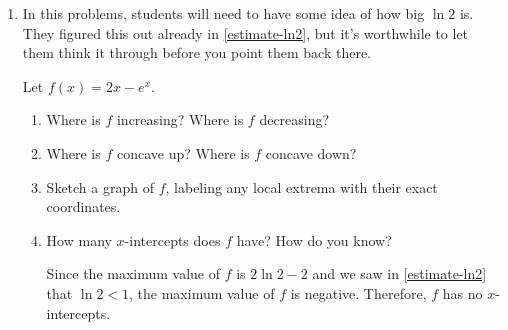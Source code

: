 \documentclass{article}
\begin{document}
\begin{enumerate}
\begin{enumerate}
  \end{enumerate}


\item 

  \begin{workshop}
    In this problems, students will need to have some idea of how big $\ln 2$ is. They figured this out already in \ref{estimate-ln2}, but it's worthwhile to let them think it through before you point them back there. 
  \end{workshop}

  Let $f(x) = 2x - e^x$.

  \begin{enumerate}
  \item

    \begin{problem}[\vfill]
      Where is $f$ increasing? Where is $f$ decreasing? 
    \end{problem}

  \item
    \begin{problem}[\vfill]
      Where is $f$ concave up? Where is $f$ concave down? 
    \end{problem}

  \item
    \begin{problem}[\vfill]
      Sketch a graph of $f$, labeling any local extrema with their exact coordinates. 
    \end{problem}

  \item

    \begin{problem}[0.25in]
      How many $x$-intercepts does $f$ have? How do you know?
    \end{problem}

    \begin{solution}
      Since the maximum value of $f$ is $2 \ln 2 - 2$ and we saw in \ref{estimate-ln2} that $\ln 2 < 1$, the maximum value of $f$ is negative. Therefore, $f$ has no $x$-intercepts.      
    \end{solution}

  \end{enumerate}

\end{enumerate}
\end{document}

